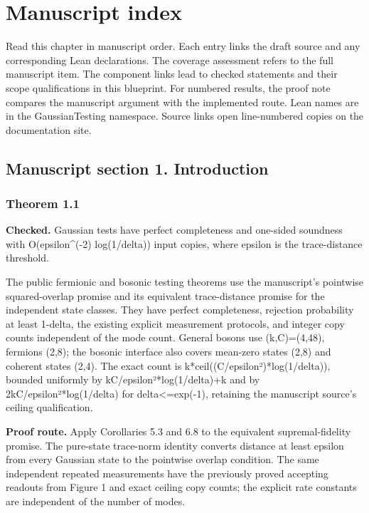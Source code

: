 \chapter{Manuscript index}\label{sec:manuscript-index}
Read this chapter in manuscript order. Each entry links the draft source and any corresponding Lean declarations. The coverage assessment refers to the full manuscript item. The component links lead to checked statements and their scope qualifications in this blueprint. For numbered results, the proof note compares the manuscript argument with the implemented route. Lean names are in the GaussianTesting namespace. Source links open line-numbered copies on the documentation site.

\section{Manuscript section 1. Introduction}
\subsection{Theorem 1.1}\label{paper:r1-1}
\textbf{Checked.} Gaussian tests have perfect completeness and one-sided soundness with O(epsilon\textasciicircum{}(-2) log(1/delta)) input copies, where epsilon is the trace-distance threshold. 

The public fermionic and bosonic testing theorems use the manuscript’s pointwise squared-overlap promise and its equivalent trace-distance promise for the independent state classes. They have perfect completeness, rejection probability at least 1-delta, the existing explicit measurement protocols, and integer copy counts independent of the mode count. General bosons use (k,C)=(4,48), fermions (2,8); the bosonic interface also covers mean-zero states (2,8) and coherent states (2,4). The exact count is k*ceil((C/epsilon²)*log(1/delta)), bounded uniformly by kC/epsilon²*log(1/delta)+k and by 2kC/epsilon²*log(1/delta) for delta<=exp(-1), retaining the manuscript source’s ceiling qualification.

\textbf{Proof route.} Apply Corollaries 5.3 and 6.8 to the equivalent supremal-fidelity promise. The pure-state trace-norm identity converts distance at least epsilon from every Gaussian state to the pointwise overlap condition. The same independent repeated measurements have the previously proved accepting readouts from Figure 1 and exact ceiling copy counts; the explicit rate constants are independent of the number of modes.

